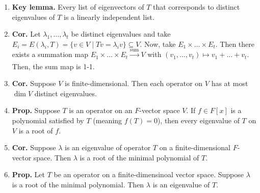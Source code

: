 \begin{enumerate}
	\item \textbf{Key lemma. } Every list of eigenvectors of $T$ that corresponds to distinct eigenvalues of $T$ is a linearly independent list. 
	\item \textbf{Cor. } Let $\lambda_1,\dots,\lambda_t$ be distinct eigenvalues and take $E_i = E(\lambda_i,T) = \{v \in V \mid Tv = \lambda_iv\} \subseteq V$. Now, take $E_1 \times \dots \times E_t$. Then there exists a summation map $E_1 \times \dots \times E_t \xrightarrow[]{\textrm{sum}} V$ with $(v_1,\dots,v_t) \mapsto v_1 + \dots + v_t$. Then, the sum map is 1-1. 
	\item \textbf{Cor. } Suppose $V$ is finite-dimensional. Then each operator on $V$ has at most $\dim V$ distinct eigenvalues. 
	\item \textbf{Prop. } Suppose $T$ is an operator on an $F$-vector space $V$. If $f \in F[x]$ is a polynomial satisfied by $T$ (meaning $f(T)=0$), then every eigenvalue of $T$ on $V$ is a root of $f$. 
	\item \textbf{Cor. } Suppose $\lambda$ is an eigenvalue of operator $T$ on a finite-dimensional $F$-vector space. Then $\lambda$ is a root of the minimal polynomial of $T$. 
	\item \textbf{Prop. } Let $T$ be an operator on a finite-dimensinoal vector space. Suppose $\lambda$ is a root of the minimal polynomial. Then $\lambda$ is an eigenvalue of $T$. 
\end{enumerate}


